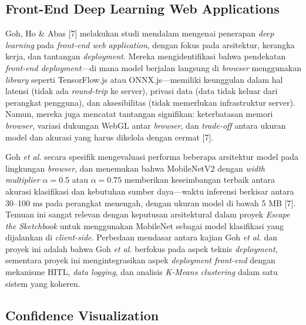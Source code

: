 \documentclass[10pt,twoside,openright]{report}
\begin{document}
\subsection{Front-End Deep Learning Web Applications}
\label{subsec:penelitian-frontend-dl}

Goh, Ho \& Abas [7] melakukan studi mendalam mengenai penerapan \textit{deep learning} pada \textit{front-end web application}, dengan fokus pada arsitektur, kerangka kerja, dan tantangan \textit{deployment}. Mereka mengidentifikasi bahwa pendekatan \textit{front-end deployment}—di mana model berjalan langsung di \textit{browser} menggunakan \textit{library} seperti TensorFlow.js atau ONNX.js—memiliki keunggulan dalam hal latensi (tidak ada \textit{round-trip} ke server), privasi data (data tidak keluar dari perangkat pengguna), dan aksesibilitas (tidak memerlukan infrastruktur server). Namun, mereka juga mencatat tantangan signifikan: keterbatasan memori \textit{browser}, variasi dukungan WebGL antar \textit{browser}, dan \textit{trade-off} antara ukuran model dan akurasi yang harus dikelola dengan cermat [7].

Goh \textit{et al.} secara spesifik mengevaluasi performa beberapa arsitektur model pada lingkungan \textit{browser}, dan menemukan bahwa MobileNetV2 dengan \textit{width multiplier} $\alpha = 0.5$ atau $\alpha = 0.75$ memberikan keseimbangan terbaik antara akurasi klasifikasi dan kebutuhan sumber daya—waktu inferensi berkisar antara 30--100 ms pada perangkat menengah, dengan ukuran model di bawah 5 MB [7]. Temuan ini sangat relevan dengan keputusan arsitektural dalam proyek \textit{Escape the Sketchbook} untuk menggunakan MobileNet sebagai model klasifikasi yang dijalankan di \textit{client-side}. Perbedaan mendasar antara kajian Goh \textit{et al.} dan proyek ini adalah bahwa Goh \textit{et al.} berfokus pada aspek teknis \textit{deployment}, sementara proyek ini mengintegrasikan aspek \textit{deployment front-end} dengan mekanisme HITL, \textit{data logging}, dan analisis \textit{K-Means clustering} dalam satu sistem yang koheren.

\subsection{Confidence Visualization}
\label{subsec:penelitian-confidence-vis}
\end{document}
